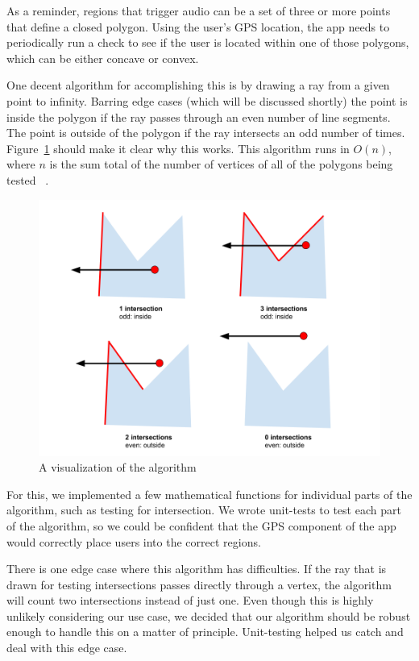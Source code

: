 \documentclass[a4paper, 10pt, american, titlepage]{article}
\begin{document}
As a reminder, regions that trigger audio can be a set of three or more points
that define a closed polygon. Using the user's GPS location, the app needs to
periodically run a check to see if the user is located within one of those
polygons, which can be either concave or convex.

One decent algorithm for accomplishing this is by drawing a ray from a given
point to infinity. Barring edge cases (which will be discussed shortly) the
point is inside the polygon if the ray passes through an even number of line
segments.  The point is outside of the polygon if the ray intersects an odd
number of times. Figure~\ref{fig:intersectionsDiagram} should make it clear why
this works. This algorithm runs in $O(n)$, where $n$ is the sum total of the
number of vertices of all of the polygons being tested
~\autocite{geeksforgeekspolygon}.

\begin{figure}[h]
	\centering
	\includegraphics[width=\textwidth]{intersections-diagram.png}
	\caption{A visualization of the algorithm}
	\label{fig:intersectionsDiagram}
\end{figure}

For this, we implemented a few mathematical functions for individual parts of
the algorithm, such as testing for intersection. We wrote unit-tests to test
each part of the algorithm, so we could be confident that the GPS component of
the app would correctly place users into the correct regions.

There is one edge case where this algorithm has difficulties. If the ray that
is drawn for testing intersections passes directly through a vertex, the
algorithm will count two intersections instead of just one. Even though this is
highly unlikely considering our use case, we decided that our algorithm should
be robust enough to handle this on a matter of principle. Unit-testing helped us
catch and deal with this edge case.
\end{document}
